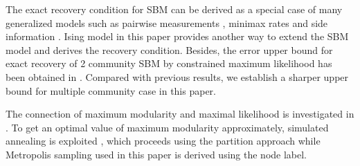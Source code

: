 \documentclass[entropy,article,submit,moreauthors,pdftex]{Definitions/mdpi}
\newcommand{\1}{\mathbbm{1}}
\begin{document}
The exact recovery condition for SBM can be derived as a special case of many generalized models such as pairwise measurements \cite{chen2016information},
minimax rates \cite{hajek2016achieving} and side information \cite{saad2018community}. Ising model in this paper provides another way to extend the
SBM model and derives the recovery condition. Besides,
the error upper bound for exact recovery of 2 community SBM by constrained maximum likelihood has been obtained in \cite{abbe2015exact}.
Compared with previous results, we establish a sharper upper bound for multiple community case in this paper.

The connection of maximum modularity and maximal likelihood is investigated in \cite{newman2016equivalence}. To get an optimal value
of maximum modularity approximately, simulated annealing is exploited \cite{he2016fast}, which proceeds using the partition approach while Metropolis sampling
used in this paper is derived using the node label.

\end{document}
